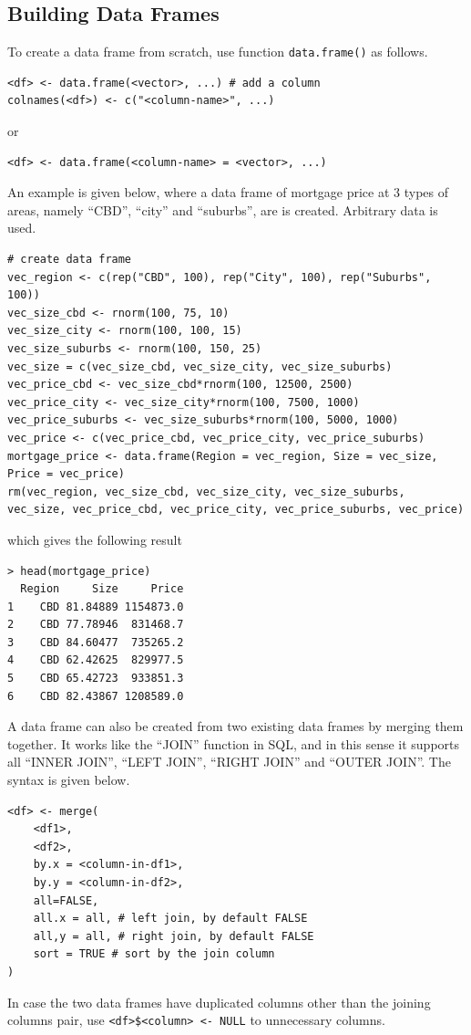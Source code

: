 \subsection{Building Data Frames}

To create a data frame from scratch, use function \verb|data.frame()| as follows.
\begin{lstlisting}
<df> <- data.frame(<vector>, ...) # add a column
colnames(<df>) <- c("<column-name>", ...)
\end{lstlisting}
or
\begin{lstlisting}
<df> <- data.frame(<column-name> = <vector>, ...)
\end{lstlisting}

An example is given below, where a data frame of mortgage price at 3 types of areas, namely ``CBD'', ``city'' and ``suburbs'', are is created. Arbitrary data is used.
\begin{lstlisting}
# create data frame
vec_region <- c(rep("CBD", 100), rep("City", 100), rep("Suburbs", 100))
vec_size_cbd <- rnorm(100, 75, 10)
vec_size_city <- rnorm(100, 100, 15)
vec_size_suburbs <- rnorm(100, 150, 25)
vec_size = c(vec_size_cbd, vec_size_city, vec_size_suburbs)
vec_price_cbd <- vec_size_cbd*rnorm(100, 12500, 2500)
vec_price_city <- vec_size_city*rnorm(100, 7500, 1000)
vec_price_suburbs <- vec_size_suburbs*rnorm(100, 5000, 1000)
vec_price <- c(vec_price_cbd, vec_price_city, vec_price_suburbs)
mortgage_price <- data.frame(Region = vec_region, Size = vec_size, Price = vec_price)
rm(vec_region, vec_size_cbd, vec_size_city, vec_size_suburbs, vec_size, vec_price_cbd, vec_price_city, vec_price_suburbs, vec_price)
\end{lstlisting}
which gives the following result
\begin{lstlisting}
> head(mortgage_price)
  Region     Size     Price
1    CBD 81.84889 1154873.0
2    CBD 77.78946  831468.7
3    CBD 84.60477  735265.2
4    CBD 62.42625  829977.5
5    CBD 65.42723  933851.3
6    CBD 82.43867 1208589.0
\end{lstlisting}

A data frame can also be created from two existing data frames by merging them together. It works like the ``JOIN'' function in SQL, and in this sense it supports all ``INNER JOIN'', ``LEFT JOIN'', ``RIGHT JOIN'' and ``OUTER JOIN''. The syntax is given below.
\begin{lstlisting}
<df> <- merge(
    <df1>,
    <df2>,
    by.x = <column-in-df1>,
    by.y = <column-in-df2>,
    all=FALSE,
    all.x = all, # left join, by default FALSE
    all,y = all, # right join, by default FALSE
    sort = TRUE # sort by the join column
)
\end{lstlisting}
In case the two data frames have duplicated columns other than the joining columns pair, use \verb|<df>$<column> <- NULL| to unnecessary columns.

